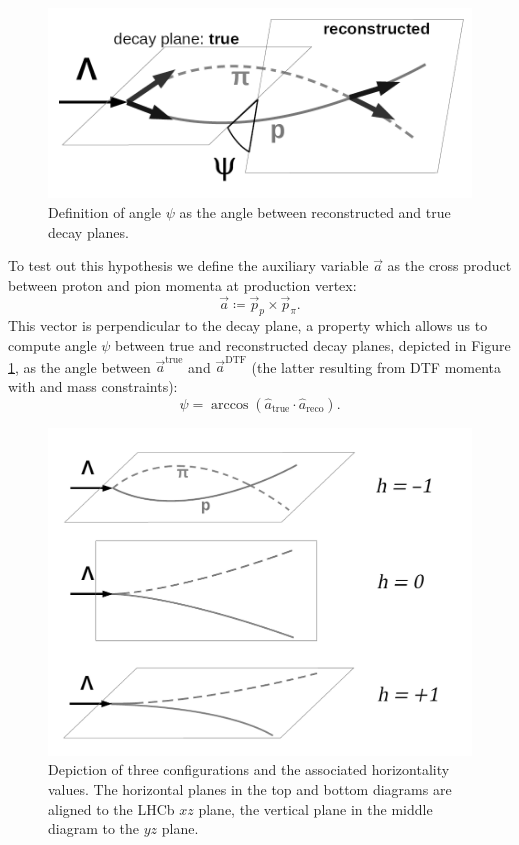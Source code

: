 \begin{figure}[t]
	\centering
	\includegraphics[width=.7\textwidth]{graphics/03-vertex_reconstruction/psi_diagram.png}
	\caption{Definition of angle $\psi$ as the angle between reconstructed and true \lambdadecay decay planes.}
	\label{fig:3:psi_explanation}
\end{figure}

To test out this hypothesis we define the auxiliary variable $\vec{a}$ as the cross product between proton and pion momenta at production vertex:
\begin{equation}
\vec{a} \coloneqq \vec{p}_p \times \vec{p}_\pi.
\end{equation}
This vector is perpendicular to the \lambdadecay decay plane, a property which allows us to compute angle $\psi$ between true and reconstructed decay planes, depicted in Figure \ref{fig:3:psi_explanation}, as the angle between $\vec{a}^\text{true}$ and $\vec{a}^\text{DTF}$ (the latter resulting from DTF momenta with \jpsi and \lz mass constraints):
\begin{equation}
\psi = \arccos{\left( \hat{a}_\text{true} \cdot \hat{a}_\text{reco} \right)}.
\label{eq:3:psi}
\end{equation}

\begin{figure}[t]
	\centering
	\includegraphics[width=.7\textwidth]{graphics/03-vertex_reconstruction/horizontality_illustration_bw.png}
	\caption{Depiction of three \lambdadecay configurations and the associated horizontality values. The horizontal planes in the top and bottom diagrams are aligned to the LHCb $xz$ plane, the vertical plane in the middle diagram to the $yz$ plane.}
	\label{fig:3:horizontality_explanation}
\end{figure}


